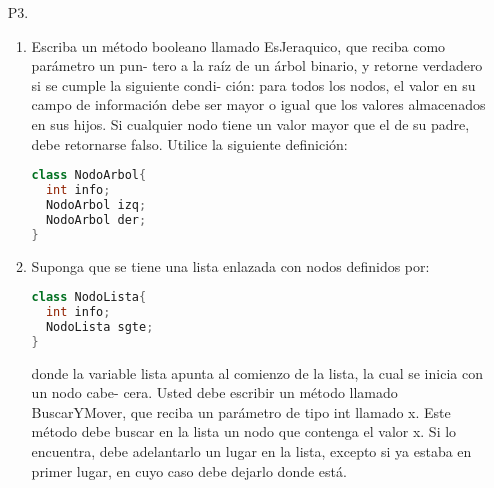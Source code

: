 \documentclass[dcc]{fcfmcourse}
\begin{document}
\begin{itemize}
\item[P3.] 
\begin{enumerate}
\item Escriba un método booleano llamado EsJeraquico, que reciba como parámetro un pun-
tero a la raíz de un árbol binario, y retorne verdadero si se cumple la siguiente condi-
ción: para todos los nodos, el valor en su campo de información debe ser mayor o igual
que los valores almacenados en sus hijos. Si cualquier nodo tiene un valor mayor que
el de su padre, debe retornarse falso. Utilice la siguiente definición:

\begin{lstlisting}[language=Java, frame=single]
class NodoArbol{
  int info;
  NodoArbol izq;
  NodoArbol der;
}
\end{lstlisting}

\item Suponga que se tiene una lista enlazada con nodos definidos por:

\begin{lstlisting}[language=Java, frame=single]
class NodoLista{
  int info;
  NodoLista sgte;
}
\end{lstlisting}

donde la variable lista apunta al comienzo de la lista, la cual se inicia con un nodo cabe-
cera. Usted debe escribir un método llamado BuscarYMover, que reciba un parámetro
de tipo int llamado x. Este método debe buscar en la lista un nodo que contenga el valor
x. Si lo encuentra, debe adelantarlo un lugar en la lista, excepto si ya estaba en primer
lugar, en cuyo caso debe dejarlo donde está. 
\end{enumerate}

\end{itemize}
\end{document}
